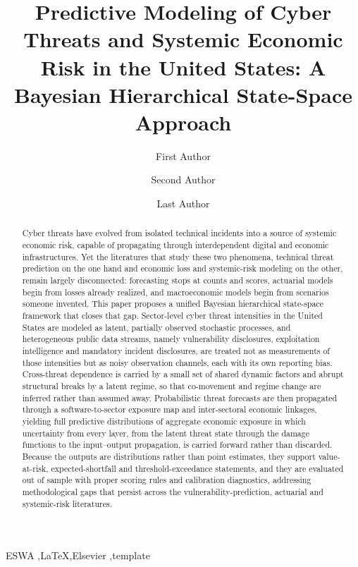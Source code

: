 \documentclass[review]{elsarticle}
\begin{document}
\begin{frontmatter}
\title{Predictive Modeling of Cyber Threats and Systemic Economic Risk in the United States: A Bayesian Hierarchical State-Space Approach}

\author[label1,label2]{First Author}

\author[label1]{Second Author}

\author[label3]{Last Author }

\address[label1]{Full address of first author, including the country name}
\address[label2]{Full address of second author, including the country name}
\address[label3]{Full address of last author, including the country name}

\begin{abstract}
Cyber threats have evolved from isolated technical incidents into a source of systemic economic risk, capable of propagating through interdependent digital and economic infrastructures. Yet the literatures that study these two phenomena, technical threat prediction on the one hand and economic loss and systemic-risk modeling on the other, remain largely disconnected: forecasting stops at counts and scores, actuarial models begin from losses already realized, and macroeconomic models begin from scenarios someone invented. This paper proposes a unified Bayesian hierarchical state-space framework that closes that gap. Sector-level cyber threat intensities in the United States are modeled as latent, partially observed stochastic processes, and heterogeneous public data streams, namely vulnerability disclosures, exploitation intelligence and mandatory incident disclosures, are treated not as measurements of those intensities but as noisy observation channels, each with its own reporting bias. Cross-threat dependence is carried by a small set of shared dynamic factors and abrupt structural breaks by a latent regime, so that co-movement and regime change are inferred rather than assumed away. Probabilistic threat forecasts are then propagated through a software-to-sector exposure map and inter-sectoral economic linkages, yielding full predictive distributions of aggregate economic exposure in which uncertainty from every layer, from the latent threat state through the damage functions to the input--output propagation, is carried forward rather than discarded. Because the outputs are distributions rather than point estimates, they support value-at-risk, expected-shortfall and threshold-exceedance statements, and they are evaluated out of sample with proper scoring rules and calibration diagnostics, addressing methodological gaps that persist across the vulnerability-prediction, actuarial and systemic-risk literatures.
\end{abstract}

\begin{keyword}
ESWA \sep \LaTeX \sep Elsevier \sep template
\end{keyword}

\end{frontmatter}
\end{document}
